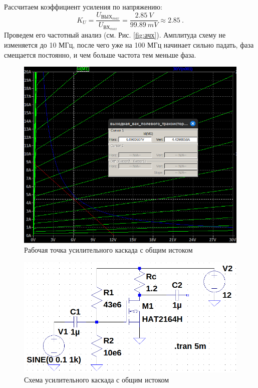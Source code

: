 Рассчитаем коэффициент усиления по напряжению:
\begin{equation*}
    K_U=\frac{U_{\text{ВЫХ}_{max}}}{U_{\text{ВХ}_{max}}}=\frac{2.85\ V}{99.89\ mV}
    \approx 2.85\ .
\end{equation*}
Проведем его частотный анализ (см. Рис. \ref{fig:ачх}). Амплитуда схему не
изменяется до 10 МГц, после чего уже на 100 МГц начинает сильно падать, фаза
смещается постоянно, и чем больше частота тем меньше фаза.

\begin{figure}[H]
    \centering
    \includegraphics[width=0.8\linewidth]{figs/рабочая точка.png}
    \caption{Рабочая точка усилительного каскада с общим истоком}
    \label{fig:рабочая_точка}
\end{figure}

\begin{figure}[H]
    \centering
    \includegraphics[width=\linewidth]{figs/схема_общий_исток.png}
    \caption{Схема усилительного каскада с общим истоком}
    \label{fig:общий_исток}
\end{figure}

